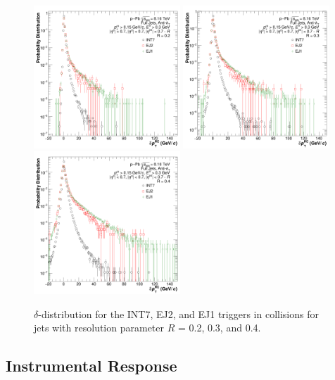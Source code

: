 \begin{figure}[hbt!]
  \centering
  \includegraphics[width=0.49\textwidth]{figures/pPbFigures/BGSubtraction/plotDpT_R02.png}
  \includegraphics[width=0.49\textwidth]{figures/pPbFigures/BGSubtraction/plotDpT_R03.png}
  \includegraphics[width=0.49\textwidth]{figures/pPbFigures/BGSubtraction/plotDpT_R04.png}
  \caption{$\delta$-\pT distribution for the INT7, EJ2, and EJ1 triggers in \pPb collisions for jets with resolution parameter $R$ = 0.2, 0.3, and 0.4.}
  \label{fig:DeltaPt_distribution}
\end{figure}

\subsection{Instrumental Response}
\label{sec:InstResponse}


